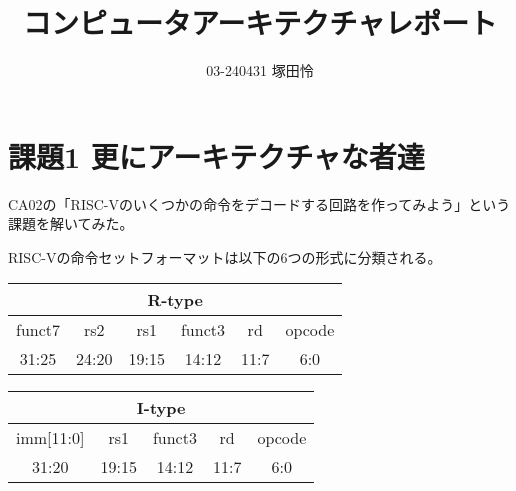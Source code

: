 \documentclass{jlreq}
\title{コンピュータアーキテクチャレポート}
\author{03-240431 塚田怜}
\begin{document}
\maketitle

\section{課題1 更にアーキテクチャな者達}
CA02の「RISC-Vのいくつかの命令をデコードする回路を作ってみよう」という課題を解いてみた。

RISC-Vの命令セットフォーマットは以下の6つの形式に分類される。

\vspace{0.5cm}

\begin{center}
    \begin{tabular}{|*{32}{c|}}
        \hline
        \multicolumn{32}{|c|}{R-type} \\
        \hline
        \multicolumn{7}{|c|}{funct7} & \multicolumn{5}{c|}{rs2} & \multicolumn{5}{c|}{rs1} & \multicolumn{3}{c|}{funct3} & \multicolumn{5}{c|}{rd} & \multicolumn{7}{c|}{opcode} \\
        \hline
        \multicolumn{7}{|c|}{31:25} & \multicolumn{5}{c|}{24:20} & \multicolumn{5}{c|}{19:15} & \multicolumn{3}{c|}{14:12} & \multicolumn{5}{c|}{11:7} & \multicolumn{7}{c|}{6:0} \\
        \hline
    \end{tabular}
\end{center}
\vspace{0.5cm}

\begin{center}
    \begin{tabular}{|*{32}{c|}}
        \hline
        \multicolumn{32}{|c|}{I-type} \\
        \hline
        \multicolumn{12}{|c|}{imm[11:0]} & \multicolumn{5}{c|}{rs1} & \multicolumn{3}{c|}{funct3} & \multicolumn{5}{c|}{rd} & \multicolumn{7}{c|}{opcode} \\
        \hline
        \multicolumn{12}{|c|}{31:20} & \multicolumn{5}{c|}{19:15} & \multicolumn{3}{c|}{14:12} & \multicolumn{5}{c|}{11:7} & \multicolumn{7}{c|}{6:0} \\
        \hline
    \end{tabular}
\end{center}
\vspace{0.5cm}
\end{document}
